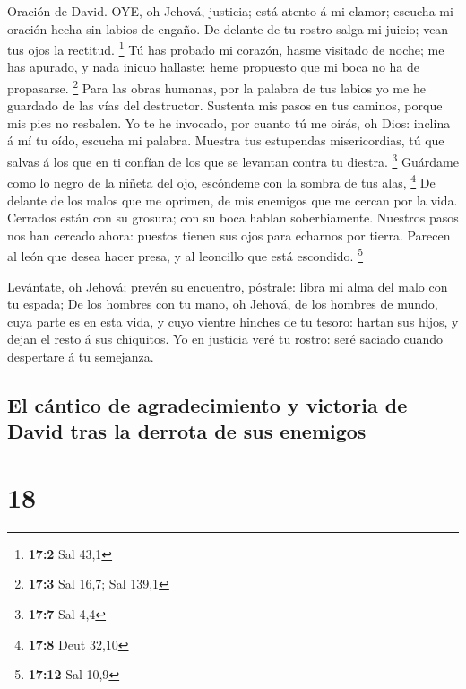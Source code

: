  Oración de David. OYE, oh Jehová, justicia; está atento á
mi clamor; escucha mi oración hecha sin labios de engaño. 
De delante de tu rostro salga mi juicio; vean tus ojos la rectitud.
\footnote{\textbf{17:2} Sal 43,1}  Tú has probado mi
corazón, hasme visitado de noche; me has apurado, y nada inicuo
hallaste: heme propuesto que mi boca no ha de propasarse. \footnote{\textbf{17:3}
  Sal 16,7; Sal 139,1}  Para las obras humanas, por la
palabra de tus labios yo me he guardado de las vías del destructor.
 Sustenta mis pasos en tus caminos, porque mis pies no
resbalen.  Yo te he invocado, por cuanto tú me oirás, oh
Dios: inclina á mí tu oído, escucha mi palabra.  Muestra tus
estupendas misericordias, tú que salvas á los que en ti confían de los
que se levantan contra tu diestra. \footnote{\textbf{17:7} Sal 4,4}
 Guárdame como lo negro de la niñeta del ojo, escóndeme con
la sombra de tus alas, \footnote{\textbf{17:8} Deut 32,10} 
De delante de los malos que me oprimen, de mis enemigos que me cercan
por la vida.  Cerrados están con su grosura; con su boca
hablan soberbiamente.  Nuestros pasos nos han cercado
ahora: puestos tienen sus ojos para echarnos por tierra. 
Parecen al león que desea hacer presa, y al leoncillo que está
escondido. \footnote{\textbf{17:12} Sal 10,9}

 Levántate, oh Jehová; prevén su encuentro, póstrale: libra
mi alma del malo con tu espada;  De los hombres con tu
mano, oh Jehová, de los hombres de mundo, cuya parte es en esta vida, y
cuyo vientre hinches de tu tesoro: hartan sus hijos, y dejan el resto á
sus chiquitos.  Yo en justicia veré tu rostro: seré saciado
cuando despertare á tu semejanza.

\hypertarget{el-cuxe1ntico-de-agradecimiento-y-victoria-de-david-tras-la-derrota-de-sus-enemigos}{%
\subsection{El cántico de agradecimiento y victoria de David tras la
derrota de sus
enemigos}\label{el-cuxe1ntico-de-agradecimiento-y-victoria-de-david-tras-la-derrota-de-sus-enemigos}}

\hypertarget{section-17}{%
\section{18}\label{section-17}}

